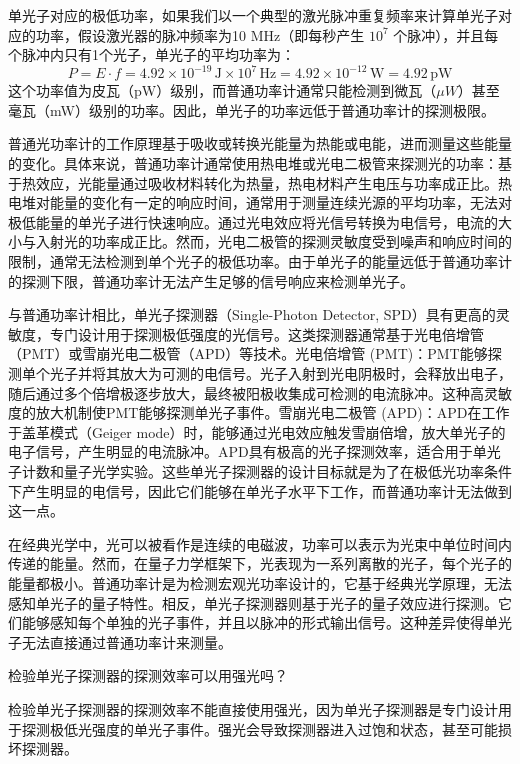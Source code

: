 单光子对应的极低功率，如果我们以一个典型的激光脉冲重复频率来计算单光子对应的功率，假设激光器的脉冲频率为10 MHz（即每秒产生 \( 10^7 \) 个脉冲），并且每个脉冲内只有1个光子，单光子的平均功率为：
\[
P = E \cdot f = 4.92 \times 10^{-19} \, \text{J} \times 10^7 \, \text{Hz} = 4.92 \times 10^{-12} \, \text{W} = 4.92 \, \text{pW}
\]
这个功率值为皮瓦（pW）级别，而普通功率计通常只能检测到微瓦（\(\mu W\)）甚至毫瓦（mW）级别的功率。因此，单光子的功率远低于普通功率计的探测极限。

普通光功率计的工作原理基于吸收或转换光能量为热能或电能，进而测量这些能量的变化。具体来说，普通功率计通常使用热电堆或光电二极管来探测光的功率：基于热效应，光能量通过吸收材料转化为热量，热电材料产生电压与功率成正比。热电堆对能量的变化有一定的响应时间，通常用于测量连续光源的平均功率，无法对极低能量的单光子进行快速响应。通过光电效应将光信号转换为电信号，电流的大小与入射光的功率成正比。然而，光电二极管的探测灵敏度受到噪声和响应时间的限制，通常无法检测到单个光子的极低功率。由于单光子的能量远低于普通功率计的探测下限，普通功率计无法产生足够的信号响应来检测单光子。

与普通功率计相比，单光子探测器（Single-Photon Detector, SPD）具有更高的灵敏度，专门设计用于探测极低强度的光信号。这类探测器通常基于光电倍增管（PMT）或雪崩光电二极管（APD）等技术。光电倍增管 (PMT)：PMT能够探测单个光子并将其放大为可测的电信号。光子入射到光电阴极时，会释放出电子，随后通过多个倍增极逐步放大，最终被阳极收集成可检测的电流脉冲。这种高灵敏度的放大机制使PMT能够探测单光子事件。雪崩光电二极管 (APD)：APD在工作于盖革模式（Geiger mode）时，能够通过光电效应触发雪崩倍增，放大单光子的电子信号，产生明显的电流脉冲。APD具有极高的光子探测效率，适合用于单光子计数和量子光学实验。这些单光子探测器的设计目标就是为了在极低光功率条件下产生明显的电信号，因此它们能够在单光子水平下工作，而普通功率计无法做到这一点。

在经典光学中，光可以被看作是连续的电磁波，功率可以表示为光束中单位时间内传递的能量。然而，在量子力学框架下，光表现为一系列离散的光子，每个光子的能量都极小。普通功率计是为检测宏观光功率设计的，它基于经典光学原理，无法感知单光子的量子特性。相反，单光子探测器则基于光子的量子效应进行探测。它们能够感知每个单独的光子事件，并且以脉冲的形式输出信号。这种差异使得单光子无法直接通过普通功率计来测量。

\begin{question}
	检验单光子探测器的探测效率可以用强光吗？
\end{question}
检验单光子探测器的探测效率不能直接使用强光，因为单光子探测器是专门设计用于探测极低光强度的单光子事件。强光会导致探测器进入过饱和状态，甚至可能损坏探测器。

